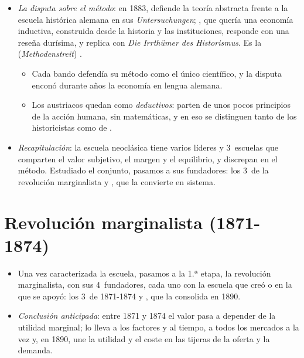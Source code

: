 \documentclass[11pt]{article}
\begin{document}
\begin{itemize}
\item \emph{La disputa sobre el método}: en 1883,  defiende la teoría abstracta frente a la escuela histórica alemana en sus \emph{Untersuchungen}\nocite{Menger1883Untersuchungen}; , que quería una economía inductiva, construida desde la historia y las instituciones, responde con una reseña durísima\nocite{Schmoller1883Methodologie}, y  replica con \emph{Die Irrthümer des Historismus}\nocite{Menger1884Irrthumer}. Es la  (\emph{Methodenstreit}) .
  \begin{itemize}
  \item Cada bando defendía su método como el único científico, y la disputa enconó durante años la economía en lengua alemana.
  \item Los austriacos quedan como \emph{deductivos}: parten de unos pocos principios de la acción humana, sin matemáticas, y en eso se distinguen tanto de los historicistas como de .
  \end{itemize}
\item \emph{Recapitulación}: la escuela neoclásica tiene varios líderes y 3~escuelas que comparten el valor subjetivo, el margen y el equilibrio, y discrepan en el método. Estudiado el conjunto, pasamos a sus fundadores: los 3~de la revolución marginalista y , que la convierte en sistema.
\end{itemize}

\section{Revolución marginalista (1871-1874)}\label{sec:revolucion}

\begin{itemize}
\item Una vez caracterizada la escuela, pasamos a la 1.ª etapa, la revolución marginalista, con sus 4~fundadores, cada uno con la escuela que creó o en la que se apoyó: los 3~de 1871-1874 y , que la consolida en 1890.
\item \emph{Conclusión anticipada}: entre 1871 y 1874 el valor pasa a depender de la utilidad marginal;  lo lleva a los factores y al tiempo,  a todos los mercados a la vez y, en 1890,  une la utilidad y el coste en las tijeras de la oferta y la demanda.
\end{itemize}
\end{document}
